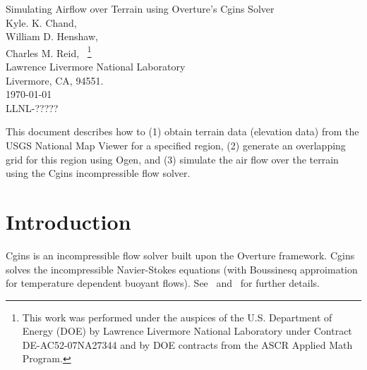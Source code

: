 \documentclass[11pt]{article}
\begin{document}
\vspace{5\baselineskip}
\begin{flushleft}
{\LARGE
Simulating Airflow over Terrain using Overture's Cgins Solver\\
}
\vspace{2\baselineskip}
Kyle. K. Chand,    \\
William D. Henshaw, \\
Charles M. Reid, 
~\footnote{This work was performed under the auspices of the U.S. Department of Energy (DOE) by
Lawrence Livermore National Laboratory under Contract DE-AC52-07NA27344 and by 
DOE contracts from the ASCR Applied Math Program.}  \\
Lawrence Livermore National Laboratory      \\
Livermore, CA, 94551.  \\
\vspace{\baselineskip}
\today\\
\vspace{\baselineskip}
LLNL-?????

\vspace{4\baselineskip}


This document describes how to (1) obtain terrain data (elevation data) from the USGS National Map Viewer for a specified region,
(2) generate an overlapping grid for this region using Ogen, and (3) simulate the air flow over the terrain
using the Cgins incompressible flow solver.

\end{flushleft}

\tableofcontents

\vfill\eject


\section{Introduction}

Cgins is an incompressible flow solver built upon the Overture framework.
Cgins solves the incompressible Navier-Stokes equations (with Boussinesq approimation
for temperature dependent buoyant flows). See~\cite{CginsUserGuide} and~\cite{CginsReferenceManual} for further 
details. 
\end{document}
